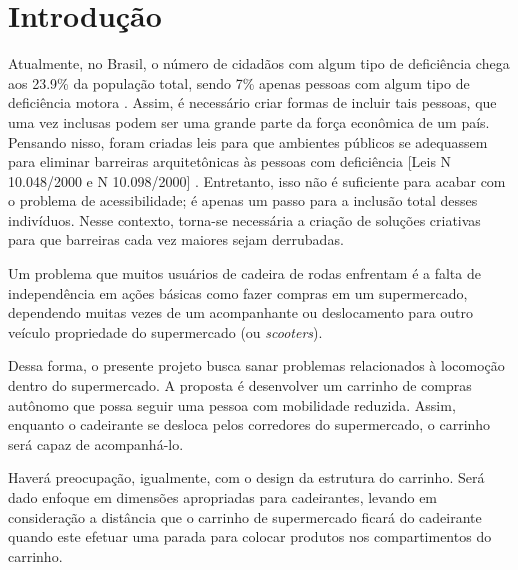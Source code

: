 \chapter[Introdução]{Introdução}


\par Atualmente, no Brasil, o número de cidadãos com algum tipo de deficiência chega aos 23.9\% da população total, sendo 7\% apenas pessoas com algum tipo de deficiência motora \cite{ibge2010}. Assim, é necessário criar formas de incluir tais pessoas, que uma vez inclusas podem ser uma grande parte da força econômica de um país. Pensando nisso, foram criadas leis para que ambientes públicos se adequassem para eliminar barreiras arquitetônicas às pessoas com deficiência [Leis N 10.048/2000 e N 10.098/2000] \cite{abnt2004}. Entretanto, isso não é suficiente para acabar com o problema de acessibilidade; é apenas um passo para a inclusão total desses indivíduos. Nesse contexto, torna-se necessária a criação de soluções criativas para que barreiras cada vez maiores sejam derrubadas. 
\par Um problema que muitos usuários de cadeira de rodas enfrentam é a falta de independência em ações básicas como fazer compras em um supermercado, dependendo muitas vezes de um acompanhante ou deslocamento para outro veículo propriedade do supermercado (ou \textit{scooters}). 

\par Dessa forma, o presente projeto busca sanar problemas relacionados à locomoção dentro do supermercado. A proposta é desenvolver um carrinho de compras autônomo que possa seguir uma pessoa com mobilidade reduzida. Assim, enquanto o cadeirante se desloca pelos corredores do supermercado, o carrinho será capaz de acompanhá-lo.
\par Haverá preocupação, igualmente, com o design da estrutura do carrinho. Será dado enfoque em dimensões apropriadas para cadeirantes, levando em consideração a distância que o carrinho de supermercado ficará do cadeirante quando este efetuar uma parada para colocar produtos nos compartimentos do carrinho.


\newpage



